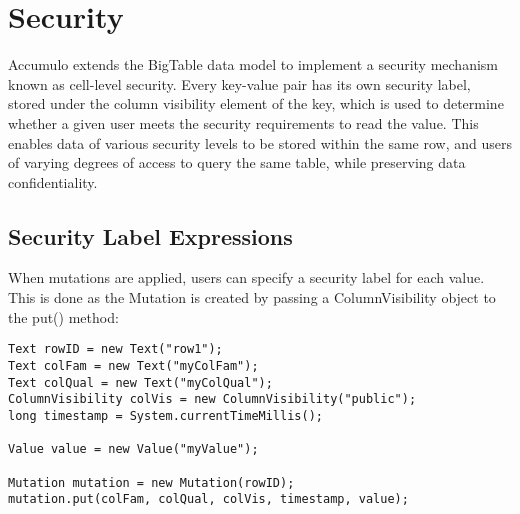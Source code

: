 
%
%

\chapter{Security}

Accumulo extends the BigTable data model to implement a security mechanism
known as cell-level security. Every key-value pair has its own security label, stored
under the column visibility element of the key, which is used to determine whether
a given user meets the security requirements to read the value. This enables data of
various security levels to be stored within the same row, and users of varying
degrees of access to query the same table, while preserving data confidentiality.

\section{Security Label Expressions}

When mutations are applied, users can specify a security label for each value. This is
done as the Mutation is created by passing a ColumnVisibility object to the put()
method:

\small
\begin{verbatim}
Text rowID = new Text("row1");
Text colFam = new Text("myColFam");
Text colQual = new Text("myColQual");
ColumnVisibility colVis = new ColumnVisibility("public");
long timestamp = System.currentTimeMillis();

Value value = new Value("myValue");

Mutation mutation = new Mutation(rowID);
mutation.put(colFam, colQual, colVis, timestamp, value);
\end{verbatim}
\normalsize

